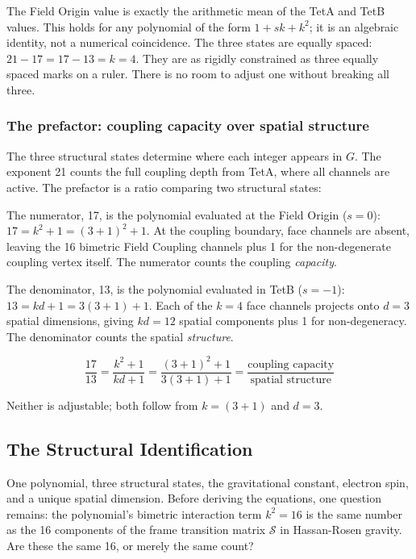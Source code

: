 \documentclass[aps,prd,preprint,superscriptaddress,showpacs,preprintnumbers,amsmath,amssymb,nofootinbib]{revtex4-2}
\begin{document}
The Field Origin value is exactly the arithmetic mean of the TetA and TetB values. This holds for any polynomial of the form $1 + sk + k^2$; it is an algebraic identity, not a numerical coincidence. The three states are equally spaced: $21 - 17 = 17 - 13 = k = 4$. They are as rigidly constrained as three equally spaced marks on a ruler. There is no room to adjust one without breaking all three.

\subsubsection*{The prefactor: coupling capacity over spatial structure}

The three structural states determine where each integer appears in $G$. The exponent 21 counts the full coupling depth from TetA, where all channels are active. The prefactor is a ratio comparing two structural states:

The numerator, 17, is the polynomial evaluated at the Field Origin ($s = 0$): $17 = k^2 + 1 = (3{+}1)^2 + 1$. At the coupling boundary, face channels are absent, leaving the 16 bimetric Field Coupling channels plus 1 for the non-degenerate coupling vertex itself. The numerator counts the coupling \emph{capacity}.

The denominator, 13, is the polynomial evaluated in TetB ($s = -1$): $13 = kd + 1 = 3(3{+}1) + 1$. Each of the $k = 4$ face channels projects onto $d = 3$ spatial dimensions, giving $kd = 12$ spatial components plus 1 for non-degeneracy. The denominator counts the spatial \emph{structure}.

\begin{equation}
\frac{17}{13} = \frac{k^2 + 1}{kd + 1} = \frac{(3{+}1)^2 + 1}{3(3{+}1) + 1} = \frac{\text{coupling capacity}}{\text{spatial structure}}
\label{eq:prefactor}
\end{equation}

Neither is adjustable; both follow from $k = (3{+}1)$ and $d = 3$.

\subsection{The Structural Identification}
\label{subsec:identification}

One polynomial, three structural states, the gravitational constant, electron spin, and a unique spatial dimension. Before deriving the equations, one question remains: the polynomial's bimetric interaction term $k^2 = 16$ is the same number as the 16 components of the frame transition matrix $\mathcal{S}$ in Hassan-Rosen gravity. Are these the same 16, or merely the same count?
\end{document}
